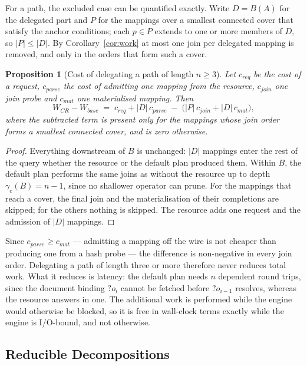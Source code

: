 \documentclass{article}
\newtheorem{proposition}{Proposition}
\begin{document}
For a path, the excluded case can be quantified exactly. Write $D = B(A)$ for the
delegated part and $P$ for the mappings over a smallest connected cover that satisfy the
anchor conditions; each $p \in P$ extends to one or more members of $D$, so
$|P| \leq |D|$. By Corollary~\ref{cor:work} at most one join per delegated mapping is
removed, and only in the orders that form such a cover.

\begin{proposition}[Cost of delegating a path of length $n \geq 3$]
Let $c_{\mathit{req}}$ be the cost of a request, $c_{\mathit{parse}}$ the cost of
admitting one mapping from the resource, $c_{\mathit{join}}$ one join probe and
$c_{\mathit{mat}}$ one materialised mapping. Then
\[
W_{CR} - W_{\mathit{base}} \;=\;
c_{\mathit{req}} + |D|\,c_{\mathit{parse}}
\;-\; \bigl( |P|\,c_{\mathit{join}} + |D|\,c_{\mathit{mat}} \bigr),
\]
where the subtracted term is present only for the mappings whose join order forms a
smallest connected cover, and is zero otherwise.
\end{proposition}

\begin{proof}
Everything downstream of $B$ is unchanged: $|D|$ mappings enter the rest of the query
whether the resource or the default plan produced them. Within $B$, the default plan
performs the same joins as without the resource up to depth $\gamma_c(B) = n-1$, since no
shallower operator can prune. For the mappings that reach a cover, the final join and the
materialisation of their completions are skipped; for the others nothing is skipped. The
resource adds one request and the admission of $|D|$ mappings.
\end{proof}

Since $c_{\mathit{parse}} \geq c_{\mathit{mat}}$ --- admitting a mapping off the wire is
not cheaper than producing one from a hash probe --- the difference is non-negative in
every join order. Delegating a path of length three or more therefore never reduces total
work. What it reduces is latency: the default plan needs $n$ dependent round trips, since
the document binding $?o_{i}$ cannot be fetched before $?o_{i-1}$ resolves, whereas the
resource answers in one. The additional work is performed while the engine would
otherwise be blocked, so it is free in wall-clock terms exactly while the engine is
I/O-bound, and not otherwise.

\subsection{Reducible Decompositions}
\end{document}
